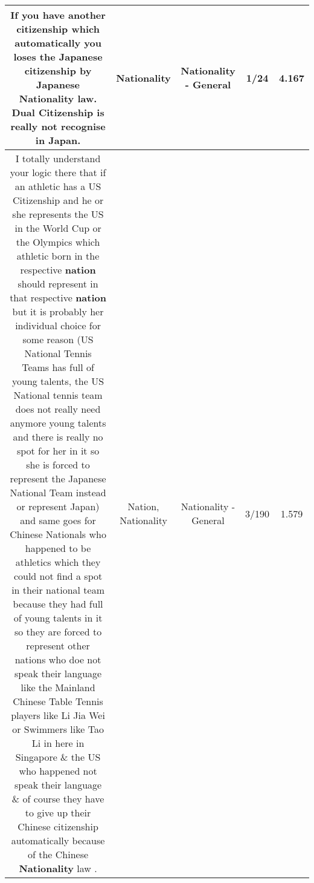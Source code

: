 \documentclass[11pt]{article}
\newlength\mylength
\begin{document}
\begin{center}
\begin{longtable}{|C{.65\mylength}|C{.30\mylength}|C{.12\mylength}|C{.12\mylength}|C{.12\mylength}|}
  \small If you have another citizenship which automatically you loses the Japanese citizenship by Japanese \textbf{Nationality} law. Dual Citizenship is really not recognise in Japan.\normalsize   & Nationality & Nationality - General & 1/24 & 4.167 \\  \hline
  \small {} I totally understand your logic there that if an athletic has a US Citizenship and he or she represents the US in the World Cup or the Olympics which athletic born in the respective \textbf{nation} should represent in that respective \textbf{nation} but it is probably her individual choice for some reason (US National Tennis Teams has full of young talents, the US National tennis team does not really need anymore young talents and there is really no spot for her in it so she is forced to represent the Japanese National Team instead or represent Japan) and same goes for Chinese Nationals who happened to be athletics which they could not find a spot in their national team because they had full of young talents in it so they are forced to represent other nations who doe not speak their language like the Mainland Chinese Table Tennis players like Li Jia Wei or Swimmers like Tao Li in here in Singapore \& the US who happened not speak their language \& of course they have to give up their Chinese citizenship automatically because of the Chinese \textbf{Nationality} law .\normalsize   & Nation, Nationality & Nationality - General & 3/190 & 1.579 \\  \hline
  
\end{longtable}
\end{center}
\end{document}
